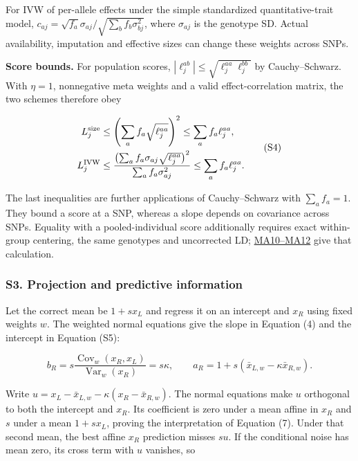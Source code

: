 \documentclass[11pt,a4paper]{article}
\begin{document}
For IVW of per-allele effects under the simple standardized quantitative-trait model, \(c_{aj}=\sqrt{f_a}\sigma_{aj}/\sqrt{\sum_bf_b\sigma_{bj}^2}\), where \(\sigma_{aj}\) is the genotype SD. Actual availability, imputation and effective sizes can change these weights across SNPs.

\textbf{Score bounds.} For population scores, \(|\ell_j^{ab}|\leq\sqrt{\ell_j^{aa}\ell_j^{bb}}\) by Cauchy--Schwarz. With \(\eta=1\), nonnegative meta weights and a valid effect-correlation matrix, the two schemes therefore obey

\[
\begin{aligned}
L_j^{\rm size}
 &\leq\left(\sum_a f_a\sqrt{\ell_j^{aa}}\right)^2
 \leq\sum_a f_a\ell_j^{aa},\\
L_j^{\rm IVW}
 &\leq\frac{\left(\sum_a f_a\sigma_{aj}\sqrt{\ell_j^{aa}}\right)^2}
                  {\sum_a f_a\sigma_{aj}^2}
 \leq\sum_a f_a\ell_j^{aa}.
\end{aligned}\tag{S4}
\]

The last inequalities are further applications of Cauchy--Schwarz with \(\sum_af_a=1\). They bound a score at a SNP, whereas a slope depends on covariance across SNPs. Equality with a pooled-individual score additionally requires exact within-group centering, the same genotypes and uncorrected LD; \href{../docs/MULTI_ANCESTRY.md}{MA10--MA12} give that calculation.

\subsubsection{S3. Projection and predictive information}\label{s3-projection-and-predictive-information}

Let the correct mean be \(1+sx_L\) and regress it on an intercept and \(x_R\) using fixed weights \(w\). The weighted normal equations give the slope in Equation (4) and the intercept in Equation (S5):

\[
b_R=s\frac{\operatorname{Cov}_w(x_R,x_L)}{\operatorname{Var}_w(x_R)}=s\kappa,
\qquad a_R=1+s(\bar x_{L,w}-\kappa\bar x_{R,w}). \tag{S5}
\]

Write \(u=x_L-\bar x_{L,w}-\kappa(x_R-\bar x_{R,w})\). The normal equations make \(u\) orthogonal to both the intercept and \(x_R\). Its coefficient is zero under a mean affine in \(x_R\) and \(s\) under a mean \(1+sx_L\), proving the interpretation of Equation (7). Under that second mean, the best affine \(x_R\) prediction misses \(su\). If the conditional noise has mean zero, its cross term with \(u\) vanishes, so
\end{document}
